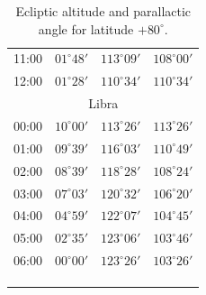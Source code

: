 \begin{table}[!h]
\begin{Parallel}{}{}
{{\begin{tabular}{l|lll}
11:00 & $01^\circ 48'$ & $113^\circ 09'$& $108^\circ 00'$ \\
12:00 & $01^\circ 28'$ & $110^\circ 34'$& $110^\circ 34'$ \\
\multicolumn{4}{c}{Libra}\\
00:00 & $10^\circ 00'$ & $113^\circ 26'$& $113^\circ 26'$ \\
01:00 & $09^\circ 39'$ & $116^\circ 03'$& $110^\circ 49'$ \\
02:00 & $08^\circ 39'$ & $118^\circ 28'$& $108^\circ 24'$ \\
03:00 & $07^\circ 03'$ & $120^\circ 32'$& $106^\circ 20'$ \\
04:00 & $04^\circ 59'$ & $122^\circ 07'$& $104^\circ 45'$ \\
05:00 & $02^\circ 35'$ & $123^\circ 06'$& $103^\circ 46'$ \\
06:00 & $00^\circ 00'$ & $123^\circ 26'$& $103^\circ 26'$ \\
\multicolumn{4}{c}{}\\
\multicolumn{4}{c}{}\\
\multicolumn{4}{c}{}\\
\end{tabular}
}}
\end{Parallel}
\caption{Ecliptic altitude and parallactic angle for latitude $+80^\circ$.}\label{ltyy}
\end{table}
